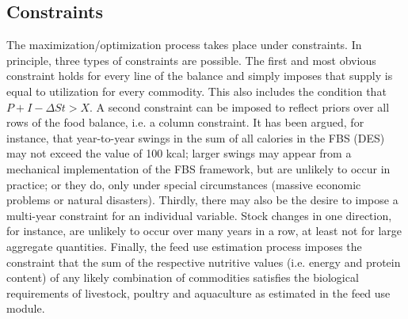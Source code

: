 \documentclass[nojss]{jss}
\begin{document}
\subsection{Constraints}
The maximization/optimization process takes place under constraints. In principle, three types of constraints are possible. The first and most obvious constraint holds for every line of the balance and simply imposes that supply is equal to utilization for every commodity. This also includes the condition that $P + I - \Delta St > X$. A second constraint can be imposed to reflect priors over all rows of the food balance, i.e. a column constraint. It has been argued, for instance, that year-to-year swings in the sum of all calories in the FBS (DES) may not exceed the value of 100 kcal; larger swings may appear from a mechanical implementation of the FBS framework, but are unlikely to occur in practice; or they do, only under special circumstances (massive economic problems or natural disasters). Thirdly, there may also be the desire to impose a multi-year constraint for an individual variable. Stock changes in one direction, for instance, are unlikely to occur over many years in a row, at least not for large aggregate quantities. Finally, the feed use estimation process imposes the constraint that the sum of the respective nutritive values (i.e. energy and protein content) of any likely combination of commodities satisfies the biological requirements of livestock, poultry and aquaculture as estimated in the feed use module. 
\end{document}
